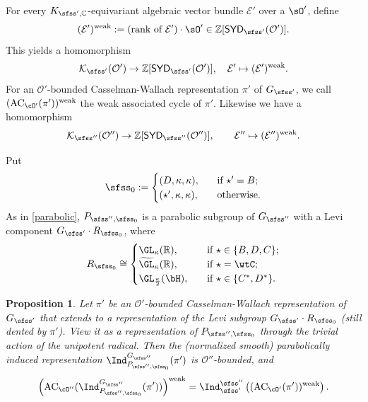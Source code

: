 \documentclass[11pt,a4paper]{amsart}
\newcommand{\AC}{\mathrm{AC}}
\def\SYD{{\mathsf{SYD}}}
\newcommand{\CE}{{\mathcal {E}}}
\newcommand{\CK}{{\mathcal {K}}}
\newcommand{\CO}{{\mathcal {O}}}
\newcommand{\Z}{\mathbb{Z}}
\newcommand{\R}{\mathbb R}
\newcommand{\be}{\begin {equation}}
\newcommand{\ee}{\end {equation}}
\numberwithin{equation}{section}
\newtheorem{prop}[thm]{Proposition}
\theoremstyle{remark}
\def\SYD{{\mathsf{SYD}}}
\def\AC{\mathrm{AC}}
\begin{document}
For every   $K_{\sfss',\C}$-equivariant algebraic vector bundle $\CE'$ over a $\sO'$, define 
\[
   (\CE')^{\mathrm{weak}}:=\textrm{(rank of $\CE'$)}\cdot \sO'\in \Z[\SYD_{\sfss'}(\CO')].
\]
This yields a homomorphism
\[
  \CK_{\sfss'}(\CO')\rightarrow \Z[\SYD_{\sfss'}(\CO')], \quad \CE'\mapsto (\CE')^{\mathrm{weak}}.
\]
For an $\CO'$-bounded Casselman-Wallach representation $\pi '$ of $G_{\sfss'}$, 
we call $(\AC_{\cO'}(\pi'))^{\mathrm{weak}}$ the weak associated cycle of $\pi'$. Likewise we have a homomorphism 
\[
  \CK_{\sfss''}(\CO'')\rightarrow \Z[\SYD_{\sfss''}(\CO'')], \qquad \CE''\mapsto (\CE'')^{\mathrm{weak}}.
\]



Put  
\[
  \sfss_0 :=
  \begin{cases}
     (D, \kappa, \kappa ),& \textrm{if $\star'=B$};\\
     (\star',\kappa, \kappa),\quad & \textrm{otherwise}.
  \end{cases}
\]
As in   
\eqref{parabolic}, 
  $P_{\sfss'',\sfss_0}$ is a parabolic subgroup of $G_{\sfss''}$ with a Levi component $G_{\sfss'}\cdot R_{\sfss_0} $, where
\[
  R_{\sfss_0} \cong
  \begin{cases}
     \GL_{\kappa}(\R),\quad & \textrm{if $\star\in \{B,D,C\}$};\\
     \widetilde \GL_{\kappa}(\R),\quad & \textrm{if $\star=\wtC$};\\
     \GL_{\frac{\kappa}{2}}(\bH),\quad & \textrm{if $\star\in \{C^*,D^*\}$}.
  \end{cases}
\]


\begin{prop}\label{lem:ind00}
Let $\pi'$ be an $\CO'$-bounded Casselman-Wallach representation of $G_{\sfss'}$ that extends to a representation of the Levi subgroup $G_{\sfss'}\cdot R_{\sfss_0}$ (still dented by $\pi'$). View it  as a representation of $P_{\sfss'',\sfss_0}$ through the trivial action of the unipotent radical. Then the (normalized smooth) parabolically induced representation $\Ind_{P_{\sfss'',\sfss_0}}^{G_{\sfss''}} (\pi')$ is $\CO''$-bounded, and 
\be\label{wac0}
 \left( \AC_{\cO''}(\Ind_{P_{\sfss'',\sfss_0}}^{G_{\sfss''}} (\pi'))\right)^{\mathrm{weak}} = \Ind_{\sfss'}^{\sfss''}\left( (\AC_{\cO'}(\pi'))^{\mathrm{weak}}\right).
\ee
\end{prop}
\end{document}
